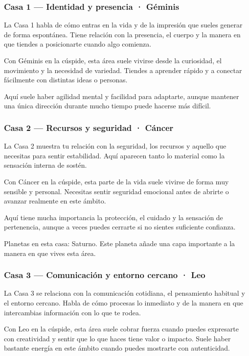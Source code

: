 \documentclass[11pt,a4paper]{article}
\begin{document}
\subsubsection*{Casa 1 — Identidad y presencia · Géminis}
La Casa 1 habla de cómo entras en la vida y de la impresión que sueles generar de forma espontánea. Tiene relación con la presencia, el cuerpo y la manera en que tiendes a posicionarte cuando algo comienza.

Con Géminis en la cúspide, esta área suele vivirse desde la curiosidad, el movimiento y la necesidad de variedad. Tiendes a aprender rápido y a conectar fácilmente con distintas ideas o personas.

Aquí suele haber agilidad mental y facilidad para adaptarte, aunque mantener una única dirección durante mucho tiempo puede hacerse más difícil.

\subsubsection*{Casa 2 — Recursos y seguridad · Cáncer}
La Casa 2 muestra tu relación con la seguridad, los recursos y aquello que necesitas para sentir estabilidad. Aquí aparecen tanto lo material como la sensación interna de sostén.

Con Cáncer en la cúspide, esta parte de la vida suele vivirse de forma muy sensible y personal. Necesitas sentir seguridad emocional antes de abrirte o avanzar realmente en este ámbito.

Aquí tiene mucha importancia la protección, el cuidado y la sensación de pertenencia, aunque a veces puedes cerrarte si no sientes suficiente confianza.

Planetas en esta casa: Saturno. Este planeta añade una capa importante a la manera en que vives esta área.

\subsubsection*{Casa 3 — Comunicación y entorno cercano · Leo}
La Casa 3 se relaciona con la comunicación cotidiana, el pensamiento habitual y el entorno cercano. Habla de cómo procesas lo inmediato y de la manera en que intercambias información con lo que te rodea.

Con Leo en la cúspide, esta área suele cobrar fuerza cuando puedes expresarte con creatividad y sentir que lo que haces tiene valor o impacto. Suele haber bastante energía en este ámbito cuando puedes mostrarte con autenticidad.
\end{document}
